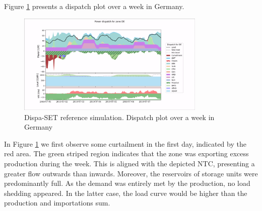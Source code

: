 Figure \ref{fig:dispatch-de-week} presents a dispatch plot over a week in Germany.

\begin{figure}[h]
    \centering
    \includegraphics[width=0.8\textwidth]{resources/images/dispatch-DE-week.png}
    \caption{Dispa-SET reference simulation. Dispatch plot over a week in Germany}
    \label{fig:dispatch-de-week}
\end{figure}

In Figure \ref{fig:dispatch-de-week} we first observe some curtailment in the first day, indicated by the red area. The green striped region indicates that the zone was exporting excess production during the week. This is aligned with the depicted NTC, presenting a greater flow outwards than inwards. Moreover, the reservoirs of storage units were predominantly full. As the demand was entirely met by the production, no load shedding appeared. In the latter case, the load curve would be higher than the production and importations sum.